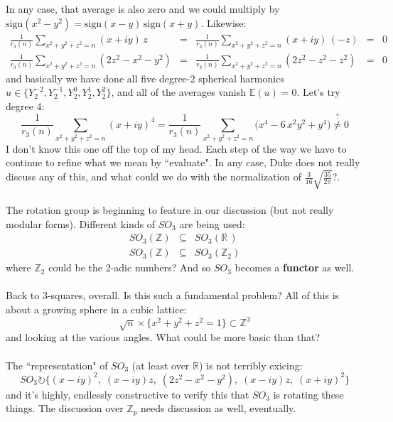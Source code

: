 \documentclass[12pt]{article}
\begin{document}
In any case, that average is also zero and we could multiply by $\text{sign}(x^2 - y^2) = \text{sign}(x-y) \,\text{sign}(x+y)$.  Likewise:
$$\begin{array}{lclcc}
\displaystyle \frac{1}{r_3(n)} \sum_{x^2 + y^2 + z^2 = n } (x + iy) \, z &=& \displaystyle \frac{1}{r_3(n)} \sum_{x^2 + y^2 + z^2 = n } (x + iy) \, (-z) &=& 0 \\
\displaystyle \frac{1}{r_3(n)} \sum_{x^2 + y^2 + z^2 = n } (2z^2 - x^2 - y^2) &=&
\displaystyle \frac{1}{r_3(n)} \sum_{x^2 + y^2 + z^2 = n } (2z^2 - z^2 - z^2) &=& 0
\end{array}$$  
and basically we have done all five degree-2 spherical harmonics $u \in \big\{ Y^{-2}_2, Y^{-1}_2, Y^{0}_2, Y^{1}_2, Y^{2}_2 \big\}$, and all of the averages vanish $\mathbb{E}(u) = 0$.  Let's try degree 4:
$$\frac{1}{r_3(n)} \sum_{x^2 + y^2 + z^2 = n } (x + iy)^4
 = \frac{1}{r_3(n)} \sum_{x^2 + y^2 + z^2 = n } \big( x^4 - 6\,x^2 y^2 + y^4 \big)  \stackrel{?}{\neq} 0 $$
I don't know this one off the top of my head.  Each step of the way we have to continue to refine what we mean by ``evaluate". In any case, Duke does not really discuss any of this, and what could we do with the normalization of $ \frac{3}{16} \sqrt{\frac{35}{2\pi}} $?. \\ \\
The rotation group is beginning to feature in our discussion (but not really modular forms).  Different kinds of $SO_3$ are being used:
\begin{eqnarray*}
SO_3(\mathbb{Z}) &\subseteq& SO_3(\mathbb{R}\,) \\
SO_3(\mathbb{Z}) &\subseteq& SO_3(\mathbb{Z}_2)
\end{eqnarray*} 
where $\mathbb{Z}_2$ could be the 2-adic numbers? And so $SO_3$ becomes a \textbf{functor} as well. \\ \\
Back to 3-squares, overall. Is this such a fundamental problem?  All of this is about a growing sphere in a cubic lattice:
$$ \sqrt{n} \times \big\{ x^2 + y^2 + z^2 = 1 \big\} \subset \mathbb{Z}^3 $$
and looking at the various angles.  What could be more basic than that? \\\\
The ``representation" of $SO_3$ (at least over $\mathbb{R}$) is not terribly exicing:
$$ SO_3 \circlearrowright \Big\{ (x-iy)^2,\; (x-iy)z,\; (2z^2 - x^2 - y^2),\;
 (x-iy)z, \;(x+iy)^2  \Big\}$$
and it's highly, endlessly constructive to verify this that $SO_3$ is rotating these things.  The discussion over $\mathbb{Z}_p$ needs discussion as well, eventually. \\ \\
\end{document}
